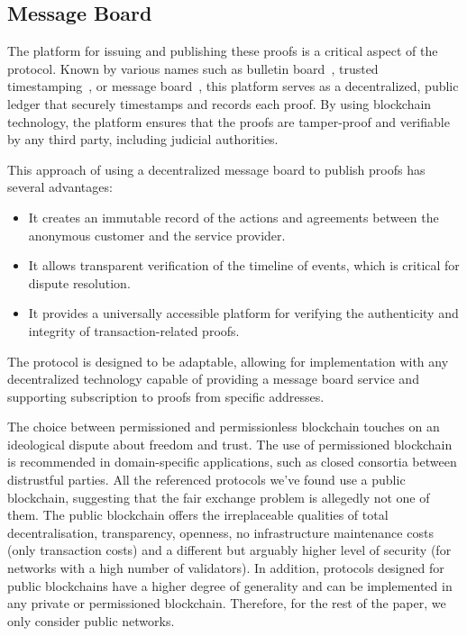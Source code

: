 \documentclass[pdftex,twocolumn,epjc3]{svjour3}
\begin{document}
\subsection{Message Board}\label{sec:message-board}
The platform for issuing and publishing these proofs is a critical aspect of the protocol. Known by various names such as bulletin board~\cite{achenbachImprovedCoercionresistantElectronic2015}, trusted timestamping~\cite{gippDecentralizedTrustedTimestamping2015}, or message board~\cite{hinarejosSolutionSecureCertified2019}, this platform serves as a decentralized, public ledger that securely timestamps and records each proof. By using blockchain technology, the platform ensures that the proofs are tamper-proof and verifiable by any third party, including judicial authorities.

This approach of using a decentralized message board to publish proofs has several advantages:
\begin{itemize}
  \item It creates an immutable record of the actions and agreements between the anonymous customer and the service provider.
  \item It allows transparent verification of the timeline of events, which is critical for dispute resolution.
\item It provides a universally accessible platform for verifying the authenticity and integrity of transaction-related proofs.
\end{itemize}

The protocol is designed to be adaptable, allowing for implementation with any decentralized technology capable of providing a message board service and supporting subscription to proofs from specific addresses.

\begin{sloppypar}
The choice between permissioned and permissionless blockchain touches on an ideological dispute about freedom and trust. The use of permissioned blockchain is recommended in domain-specific applications, such as closed consortia between distrustful parties. All the referenced protocols we've found use a public blockchain, suggesting that the fair exchange problem is allegedly not one of them. The public blockchain offers the irreplaceable qualities of total decentralisation, transparency, openness, no infrastructure maintenance costs (only transaction costs) and a different but arguably higher level of security (for networks with a high number of validators). In addition, protocols designed for public blockchains have a higher degree of generality and can be implemented in any private or permissioned blockchain. Therefore, for the rest of the paper, we only consider public networks.
\end{sloppypar}
\end{document}
